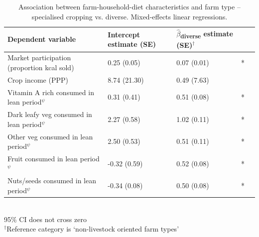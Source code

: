 \begin{table}[H]
  \captionsetup{singlelinecheck = false, justification=justified}
  \caption{
  Association between farm-household-diet characteristics and farm type -- specialised cropping vs. diverse. Mixed-effects linear regressions.
  }
  \label{tab:C_12}
  \small
\begin{tabular}{L{5cm} C{2.5cm} C{2.5cm} C{2cm} C{2cm}}
\toprule
Dependent variable & Intercept estimate (SE) & $\hat{\beta}$\textsubscript{diverse} estimate (SE)$^{\dag}$ &  \\
\midrule
Market participation (proportion kcal sold) & 0.25 (0.05) & 0.07 (0.01) & * \\
Crop income (PPP) & 8.74 (21.30) & 0.49 (7.63) & \\
Vitamin A rich consumed in lean period$^\psi$ & 0.31 (0.41) & 0.51 (0.08) & * \\
Dark leafy veg consumed in lean period$^\psi$ & 2.27 (0.58) & 1.02 (0.11) & * \\
Other veg consumed in lean period$^\psi$ & 2.50 (0.53) & 0.51 (0.11) & * \\
Fruit consumed in lean period$^\psi$ & -0.32 (0.59) & 0.52 (0.08) & * \\
Nuts/seeds consumed in lean period$^\psi$ & -0.34 (0.08) & 0.50 (0.08) & * \\
\bottomrule
\end{tabular}
\footnotesize
\raggedright
\\
95\% CI does not cross zero \\
$^{\dag}$Reference category is `non-livestock oriented farm types'
\end{table}




